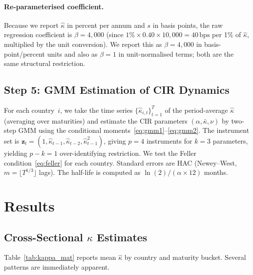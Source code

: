 \documentclass[12pt]{article}
\newcommand{\bps}{\,\text{bps}}
\theoremstyle{plain}
\theoremstyle{definition}
\theoremstyle{remark}
\begin{document}
\paragraph{Re-parameterised coefficient.}
Because we report $\hat{\kappa}$ in percent per annum and $s$ in basis points,
the raw regression coefficient is $\beta = 4{,}000$ (since $1\% \times 0.40
\times 10{,}000 = 40\bps$ per 1\% of $\hat{\kappa}$, multiplied by the unit
conversion). We report this as $\beta = 4{,}000$ in basis-point/percent units
and also as $\beta = 1$ in unit-normalised terms; both are the same structural
restriction.

\subsection{Step 5: GMM Estimation of CIR Dynamics}

For each country~$i$, we take the time series $\{\hat{\kappa}_{i,t}\}_{t=1}^{T}$
of the period-average $\hat{\kappa}$ (averaging over maturities) and estimate
the CIR parameters $(\alpha, \bar{\kappa}, \nu)$ by two-step GMM using the
conditional moments~\eqref{eq:gmm1}--\eqref{eq:gmm2}. The instrument set is
$\mathbf{z}_t = (1, \hat{\kappa}_{t-1}, \hat{\kappa}_{t-2}, \hat{\kappa}_{t-1}^2)$,
giving $p = 4$ instruments for $k = 3$ parameters, yielding $p - k = 1$
over-identifying restriction. We test the Feller condition~\eqref{eq:feller}
for each country. Standard errors are HAC (Newey--West, $m = \lfloor T^{1/3}
\rfloor$ lags). The half-life is computed as $\ln(2)/(\alpha \times 12)$
months.

\section{Results}
\label{sec:results}

\subsection{Cross-Sectional \texorpdfstring{$\kappa$}{kappa} Estimates}

Table~\ref{tab:kappa_mat} reports mean $\hat{\kappa}$ by country and maturity
bucket. Several patterns are immediately apparent.
\end{document}
